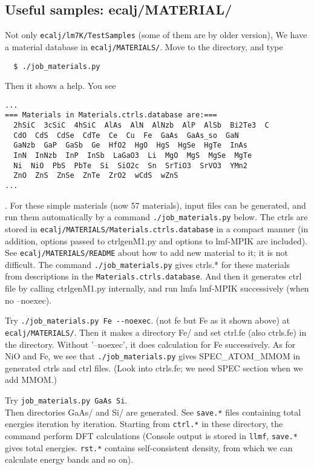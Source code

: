 \documentclass[a4paper,10pt,epsf,fleqn]{article}
\begin{document}
\subsection{Useful samples: ecalj/MATERIAL/}
Not only \verb+ecalj/lm7K/TestSamples+ (some of them are by older version),
We have a material database in \verb+ecalj/MATERIALS/+. 
Move to the directory, and type  
\begin{verbatim}
  $ ./job_materials.py
\end{verbatim}
Then it shows a help. You see 
\begin{verbatim}
...
=== Materials in Materials.ctrls.database are:===
  2hSiC  3cSiC  4hSiC  AlAs  AlN  AlNzb  AlP  AlSb  Bi2Te3  C
  CdO  CdS  CdSe  CdTe  Ce  Cu  Fe  GaAs  GaAs_so  GaN
  GaNzb  GaP  GaSb  Ge  HfO2  HgO  HgS  HgSe  HgTe  InAs
  InN  InNzb  InP  InSb  LaGaO3  Li  MgO  MgS  MgSe  MgTe
  Ni  NiO  PbS  PbTe  Si  SiO2c  Sn  SrTiO3  SrVO3  YMn2
  ZnO  ZnS  ZnSe  ZnTe  ZrO2  wCdS  wZnS
...
\end{verbatim}
. For these simple materials (now 57 materials), input files can be generated,
and run them automatically by a command \verb+./job_materials.py+ below.
The ctrls are stored in \verb+ecalj/MATERIALS/Materials.ctrls.database+
in a compact manner
(in addition, options passed to ctrlgenM1.py and options to lmf-MPIK are
included). See \verb+ecalj/MATERIALS/README+ about how to add new
material to it; it is not difficult. 
The command \verb+./job_materials.py+ gives ctrls.* for these materials
from descriptions in the \verb+Materials.ctrls.database+.
And then it generates ctrl file by calling ctrlgenM1.py internally, 
and run lmfa lmf-MPIK successively (when no --noexec).

Try \verb+./job_materials.py Fe --noexec+. (not fe but Fe as it shown above)
at \verb+ecalj/MATERIALS/+. 
Then it makes a directory Fe/ and set ctrl.fe (also ctrls.fe) in the
directory. Without '--noexec', it does calculation for Fe successively.
As for NiO and Fe, we see that \verb+./job_materials.py+ gives
SPEC\_ATOM\_MMOM in generated ctrls and ctrl files.
(Look into ctrls.fe; we need SPEC section when we add MMOM.)

Try \verb+job_materials.py GaAs Si+.\\
Then directories GaAs/ and Si/ are generated. See \verb+save.*+ files containing
total energies iteration by iteration. Starting from \verb+ctrl.*+ in
these directory, the command perform DFT calculations 
(Console output is stored in \verb+llmf+, \verb+save.*+ gives
total energies. \verb+rst.*+ contains self-consistent
density, from which we can calculate energy bands and so on).
\end{document}

